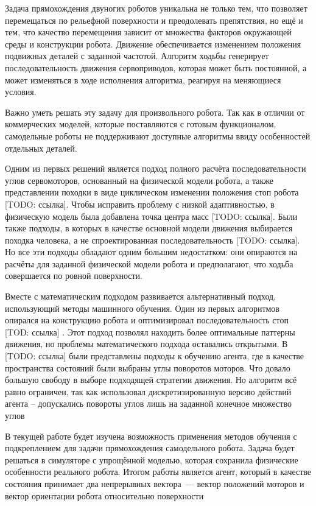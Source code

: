 
Задача прямохождения двуногих роботов уникальна не только тем, что позволяет перемещаться по рельефной поверхности и преодолевать препятствия, но ещё и тем, что качество перемещения зависит от множества факторов окружающей среды и конструкции робота. Движение обеспечивается изменением положения подвижных деталей с заданной частотой. Алгоритм ходьбы генерирует последовательность движения сервоприводов, которая может быть постоянной, а может изменяться в ходе исполнения алгоритма, реагируя на меняющиеся условия.

Важно уметь решать эту задачу для произвольного робота. Так как в отличии от коммерческих моделей, которые поставляются с готовым функционалом, самодельные роботы не поддерживают доступные алгоритмы ввиду особенностей отдельных деталей.

Одним из первых решений является подход полного расчёта последовательности углов сервомоторов, основанный на физической модели робота, а также представлении походки в виде циклическом изменении положения стоп робота [TODO: ссылка]. Чтобы исправить проблему с низкой адаптивностью, в физическую модель была добавлена точка центра масс [TODO: ссылка]. Были также подходы, в которых в качестве основной модели движения выбирается походка человека, а не спроектированная последовательность [TODO: ссылка]. Но все эти подходы обладают одним большим недостатком: они опираются на расчёты для заданной физической модели робота и предполагают, что ходьба совершается по ровной поверхности.

Вместе с математическим подходом развивается альтернативный подход, использующий методы машинного обучения. Один из первых алгоритмов опирался на конструкцию робота и оптимизировал последовательность стоп [TOD: ссылка] %
. Этот подход позволял находить более оптимальные паттерны движения, но проблемы математического подхода оставались открытыми. В [TODO: ссылка] %
были представлены подходы к обучению агента, где в качестве пространства состояний были выбраны углы поворотов моторов. Что довало большую свободу в выборе подходящей стратегии движения. Но алгоритм всё равно ограничен, так как использовал дискретизированную версию действий агента – допускались повороты углов лишь на заданной конечное множество углов

В текущей работе будет изучена возможность применения методов обучения с подкреплением для задачи прямохождения самодельного робота. Задача будет решаться в симуляторе с упрощённой моделью, которая сохранила физические особенности реального робота. Итогом работы является агент, который в качестве состояния принимает два непрерывных вектора~--- вектор положений моторов и вектор ориентации робота относительно поверхности